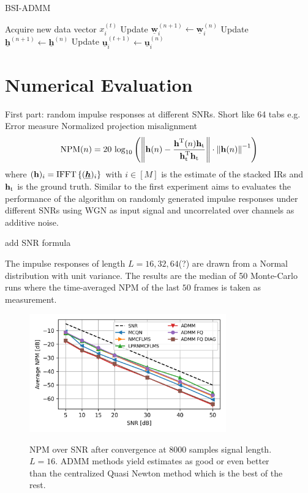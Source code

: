 \documentclass{article}
\newcommand{\h}{\mtxb{h}}
\newcommand{\hf}{\underline{\bm{h}}}
\newcommand{\wf}{\underline{\bm{w}}}
\newcommand{\uuf}{\underline{\bm{u}}}
\begin{document}
\begin{algorithm}
    \caption{BSI-ADMM}\label{alg:bsi_admm}
    \begin{algorithmic}
                \State Acquire new data vector \(x_i^{(t)}\)
                \State Update \(\wf_i^{(n+1)} \leftarrow \wf_i^{(n)}\)
            \EndFor
            \State Update \(\hf^{(n+1)} \leftarrow \hf^{(n)}\)
                \State Update \(\uuf_i^{(t+1)} \leftarrow \uuf_i^{(n)}\)
            \EndFor
        \EndFor
    \end{algorithmic}
\end{algorithm}

\section{Numerical Evaluation}
\label{sec:perf_eval}

First part: random impulse responses at different SNRs. Short like 64 tabs e.g.
Error measure Normalized projection misalignment
\begin{equation}
    \text{NPM}(n) = 20\,\log_{10} \left(\left\| \h(n) - \frac{\h^\T (n) \h_{\text{t}}}{\h_{\text{t}}^\T \h_{\text{t}}} \right\| \cdot \left\|\h(n)\right\|^{-1}\right)
\end{equation}
where \((\h)_i = \operatorname{IFFT} \left\{ (\hf)_i \right\}\) with \(i \in [M]\) is the estimate of the stacked IRs and \(\h_{\text{t}}\) is the ground truth.
Similar to \cite{} the first experiment aims to evaluates the performance of the algorithm on randomly generated impulse responses under different SNRs using WGN as input signal and uncorrelated over channels as additive noise.
\begin{attention}
    add SNR formula
\end{attention}
The impulse responses of length \(L=16,32,64\)(?) are drawn from a Normal distribution with unit variance.
The results are the median of 50 Monte-Carlo runs where the time-averaged NPM of the last \(50\) frames is taken as measurement.

\begin{figure}
    \centering
    \includegraphics[width=8.5cm]{python/plots/NPM_over_SNR_L16.png}\label{fig:perf_eval:NPM_over_SNR}
    \caption{NPM over SNR after convergence at 8000 samples signal length. \(L=16\). ADMM methods yield estimates as good or even better than the centralized Quasi Newton method which is the best of the rest.}
\end{figure}
\end{document}

